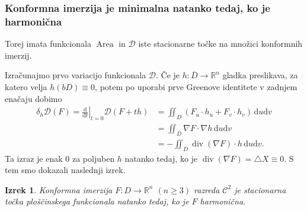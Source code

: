 \documentclass[8pt]{beamer}
\theoremstyle{definition}
\theoremstyle{remark}
\theoremstyle{plain}
\newtheorem{izrek}[definicija]{Izrek}
\numberwithin{equation}{section}  %
\begin{document}
\begin{frame}
    \frametitle{Konformna imerzija je minimalna natanko tedaj, ko je harmonična}

    Torej imata funkcionala $\operatorname{Area}$ in $\mathscr{D}$ \textcolor{red1}{iste stacionarne točke na množici konformnih imerzij}.

    \vspace{0.8em}

    Izračunajmo prvo variacijo funkcionala $\mathscr{D}$. Če je $h: \overline{D} \rightarrow \mathbb{R}^n$ gladka preslikava, za katero velja $h(bD)\equiv 0$, potem po uporabi prve Greenove identitete v zadnjem enačaju dobimo
    \begin{align*}
        \delta_h \mathscr{D}(F)=\left.\frac{\mathrm{d}}{\mathrm{d} t}\right|_{t=0} \mathscr{D}(F+t h) &=\iint_D\left(F_u \cdot h_u+F_v \cdot h_v\right) \, \mathrm{d} u \mathrm{d} v \\
        &=\iint_D \nabla F \cdot \nabla h \, \mathrm{d} u \mathrm{d} v \\
        &=-\iint_D \operatorname{div}(\nabla F) \cdot h \, \mathrm{d} u \mathrm{d} v.
    \end{align*}
    Ta izraz je enak $0$ za poljuben $h$ natanko tedaj, ko je $\operatorname{div}(\nabla F)= \bigtriangleup X \equiv 0$. S tem smo dokazali naslednji izrek.
    \begin{izrek}
        Konformna imerzija $F: D \rightarrow \mathbb{R}^n$ $(n \geq 3)$ razreda $\mathscr{C}^2$ je stacionarna točka ploščinskega funkcionala natanko tedaj, ko je $F$ harmonična.
    \end{izrek}

\end{frame}
\end{document}
